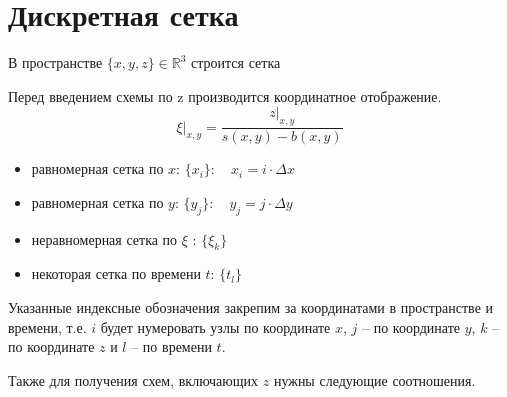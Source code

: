 \section*{Дискретная сетка}

В пространстве $ \{ x,y,z \} \in \mathbb{R}^3 $ строится сетка

Перед введением схемы по z производится координатное отображение.
\begin{equation*}
    \left.
        \xi
    \right|_{x, y}
    =
    \frac
        {
            \left.
                z
            \right|_{x, y}
        }
        {s(x, y) - b(x, y)}
\end{equation*}

\begin{itemize}
    \item равномерная сетка по $ x $: $ \{ x_i \} : \quad x_i = i \cdot \Delta x $
    \item равномерная сетка по $ y $: $ \{ y_j \} : \quad y_j = j \cdot \Delta y $
    \item неравномерная сетка по $ \xi $ : $ \{ \xi_k \} $
    \item некоторая сетка по времени $t$: $ \{t_{l}\}$
\end{itemize}

Указанные индексные обозначения закрепим за координатами в 
пространстве и времени, т.е. $i$ будет нумеровать узлы по 
координате $x$, $j$ -- по координате $y$, $k$ -- по 
координате $z$ и $l$ -- по времени $t$.

Также для получения схем, включающих $ z $ нужны следующие соотношения.

